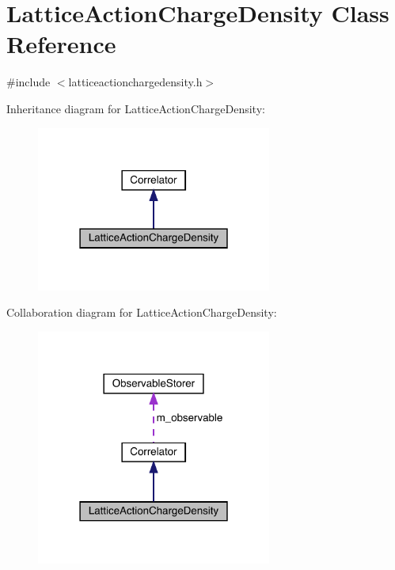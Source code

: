 \hypertarget{class_lattice_action_charge_density}{}\section{Lattice\+Action\+Charge\+Density Class Reference}
\label{class_lattice_action_charge_density}


{\ttfamily \#include $<$latticeactionchargedensity.\+h$>$}



Inheritance diagram for Lattice\+Action\+Charge\+Density\+:\nopagebreak
\begin{figure}[H]
\begin{center}
\leavevmode
\includegraphics[width=219pt]{class_lattice_action_charge_density__inherit__graph}
\end{center}
\end{figure}


Collaboration diagram for Lattice\+Action\+Charge\+Density\+:\nopagebreak
\begin{figure}[H]
\begin{center}
\leavevmode
\includegraphics[width=219pt]{class_lattice_action_charge_density__coll__graph}
\end{center}
\end{figure}
